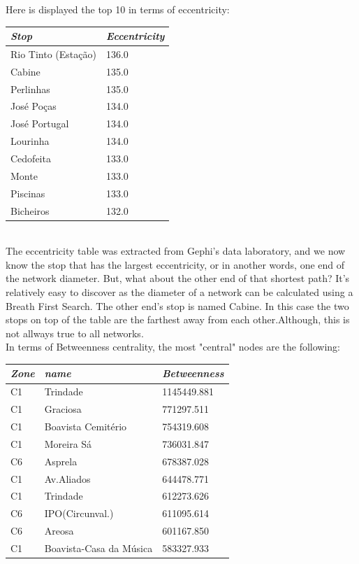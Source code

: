 \documentclass[12pt]{article}
\begin{document}
\begin{multicols}{2}
Here is displayed the top 10 in terms of eccentricity:\\
\begin{tabular}[h]{|l|l|}
\hline
\em{Stop} & \em{Eccentricity}\\
\hline
Rio Tinto (Estação) & 136.0	\\
Cabine & 135.0\\
Perlinhas & 135.0\\
José Poças & 134.0\\	
José Portugal & 134.0\\
Lourinha & 134.0\\
Cedofeita & 133.0\\
Monte & 133.0\\
Piscinas & 133.0\\	
Bicheiros & 132.0\\
\hline
\end{tabular}\\
The eccentricity table was extracted from Gephi's data laboratory, and we now know the stop that has the largest eccentricity, or in another words, one end of the network diameter. But, what about the other end of that shortest path? It's relatively easy to discover as the diameter of a network can be calculated using a Breath First Search. The other end's stop is named Cabine. In this case the two stops on top of the table are the farthest away from each other.Although, this is not allways true to all networks.\\
In terms of Betweenness centrality, the most "central" nodes are the following:
\begin{center}
\begin{tabular}[h]{|l|l|l|}
\hline
\em{Zone} & \em{name} & \em{Betweenness}\\
\hline
C1   & Trindade	& 1145449.881\\
C1	 & Graciosa	& 771297.511\\
C1	 & Boavista Cemitério & 754319.608\\
C1	 & Moreira Sá & 736031.847\\
C6 	 & Asprela & 678387.028\\
C1	 & Av.Aliados & 644478.771\\
C1	 & Trindade & 612273.626\\
C6	 & IPO(Circunval.)	& 611095.614\\
C6	 & Areosa	& 601167.850\\
C1	 & Boavista-Casa da Música	& 583327.933\\
\hline
\end{tabular}
\end{center}


\end{multicols}
\end{document}
